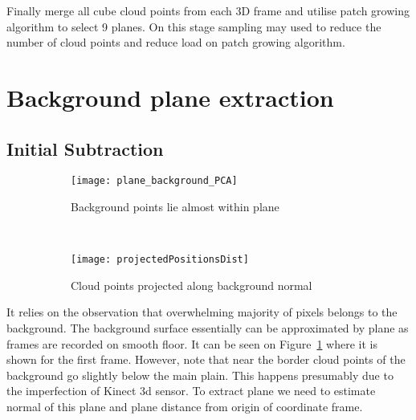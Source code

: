 \documentclass[a4paper,11pt]{article}
\theoremstyle{mytheor}
\begin{document}
Finally  merge all cube cloud points from each 3D frame and utilise patch growing algorithm to select 9 planes. On this stage sampling may used to reduce the number of cloud points and reduce load on patch growing algorithm.
  
  

\section{Background plane extraction}

\subsection{Initial Subtraction}

\begin{figure}[htbp!]
    \centering
    \begin{subfigure}[t]{0.45\textwidth}
        \centering
        \texttt{[image: plane\_background\_PCA]}
        \caption{Background points lie almost within plane}
        \label{fig:plane_background_PCA}
    \end{subfigure}%
    ~ 
    \centering
    \begin{subfigure}[t]{0.45\textwidth}
        \centering
        \texttt{[image: projectedPositionsDist]}
        \caption{Cloud points projected along background normal}
        \label{fig:projectedPositionsDist}
    \end{subfigure}
    \caption{}
\end{figure}

It relies on the observation that overwhelming majority of pixels belongs to the background. The background surface essentially can be approximated by plane as frames are recorded on smooth floor. It can be seen on Figure~\ref{fig:plane_background_PCA} where it is shown for the first frame. However, note that near the border cloud points of the background go slightly below the main plain. This happens presumably due to the imperfection of Kinect 3d sensor.  To extract plane we need to estimate normal of this plane and plane distance from origin of coordinate frame. 
\end{document}
